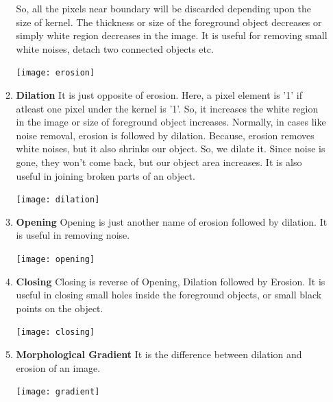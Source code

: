 \begin{enumerate}
\begin{enumerate}
    So, all the pixels near boundary will be discarded depending upon the size of kernel. The thickness or size of the foreground object decreases or simply white region decreases in the image. It is useful for removing small white noises, detach two connected objects etc.
    \begin{center}
        \texttt{[image: erosion]}
    \end{center}
    \item \textbf{Dilation}
    It is just opposite of erosion. Here, a pixel element is '1' if atleast one pixel under the kernel is '1'. So, it increases the white region in the image or size of foreground object increases. Normally, in cases like noise removal, erosion is followed by dilation. Because, erosion removes white noises, but it also shrinks our object. So, we dilate it. Since noise is gone, they won't come back, but our object area increases. It is also useful in joining broken parts of an object. 
    \begin{center}
        \texttt{[image: dilation]}
    \end{center}
    \item \textbf{Opening}
    Opening is just another name of erosion followed by dilation. It is useful in removing noise.
    \begin{center}
        \texttt{[image: opening]}
    \end{center}
    \item \textbf{Closing}
    Closing is reverse of Opening, Dilation followed by Erosion. It is useful in closing small holes inside the foreground objects, or small black points on the object. \begin{center}
        \texttt{[image: closing]}
    \end{center}
    \item \textbf{Morphological Gradient}
    It is the difference between dilation and erosion of an image.
    \begin{center}
        \texttt{[image: gradient]}
    \end{center}
    \end{enumerate}
    \pagebreak
\end{enumerate}

